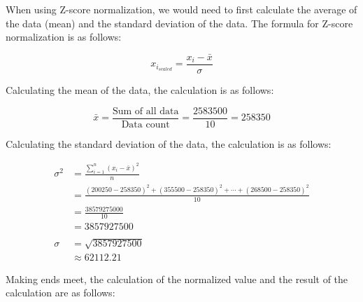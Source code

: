 \documentclass[
  11pt, %
]{assignment}
\begin{document}
When using Z-score normalization, we would need to first calculate the average of the data (mean) and the standard deviation of the data. The formula for Z-score normalization is as follows:

\[ x_{i_{scaled}} = \frac{x_i - \bar{x}}{\sigma} \]

Calculating the mean of the data, the calculation is as follows:

\[\bar{x} = \frac{\text{Sum of all data}}{\text{Data count}} = \frac{2583500}{10}  = 258350 \]

\pagebreak

Calculating the standard deviation of the data, the calculation is as follows:

\[
	\begin{aligned}
		\sigma^{2} & = \frac{\sum_{i=1}^{n}{(x_i - \bar{x})}^2}{n}                                                        \\
		           & = \frac{{(200250 - 258350)}^{2} + {(355500 - 258350)}^{2} + {\cdots } + {(268500 - 258350)}^{2}}{10} \\
		           & = \frac{38579275000}{10}                                                                             \\
		           & = 3857927500                                                                                         \\
		\\
		\sigma     & = \sqrt{3857927500}                                                                                  \\
		           & \approx 62112.21
	\end{aligned}
\]

Making ends meet, the calculation of the normalized value and the result of the calculation are as follows:
\end{document}

